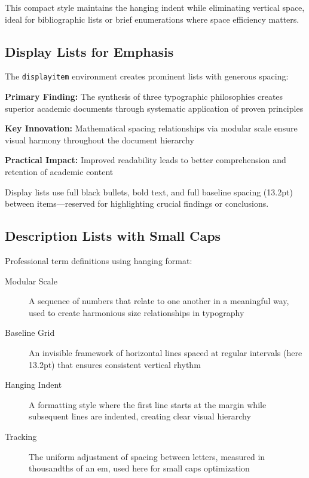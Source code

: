 \documentclass[11pt]{article}
\begin{document}
This compact style maintains the hanging indent while eliminating vertical space, ideal for bibliographic lists or brief enumerations where space efficiency matters.

\subsection{Display Lists for Emphasis}

The \texttt{displayitem} environment creates prominent lists with generous spacing:

\begin{displayitem}
\item \textbf{Primary Finding:} The synthesis of three typographic philosophies creates superior academic documents through systematic application of proven principles
\item \textbf{Key Innovation:} Mathematical spacing relationships via modular scale ensure visual harmony throughout the document hierarchy
\item \textbf{Practical Impact:} Improved readability leads to better comprehension and retention of academic content
\end{displayitem}

Display lists use full black bullets, bold text, and full baseline spacing (13.2pt) between items—reserved for highlighting crucial findings or conclusions.

\subsection{Description Lists with Small Caps}

Professional term definitions using hanging format:

\begin{description}
\item[Modular Scale] A sequence of numbers that relate to one another in a meaningful way, used to create harmonious size relationships in typography
\item[Baseline Grid] An invisible framework of horizontal lines spaced at regular intervals (here 13.2pt) that ensures consistent vertical rhythm
\item[Hanging Indent] A formatting style where the first line starts at the margin while subsequent lines are indented, creating clear visual hierarchy
\item[Tracking] The uniform adjustment of spacing between letters, measured in thousandths of an em, used here for small caps optimization
\end{description}
\end{document}
